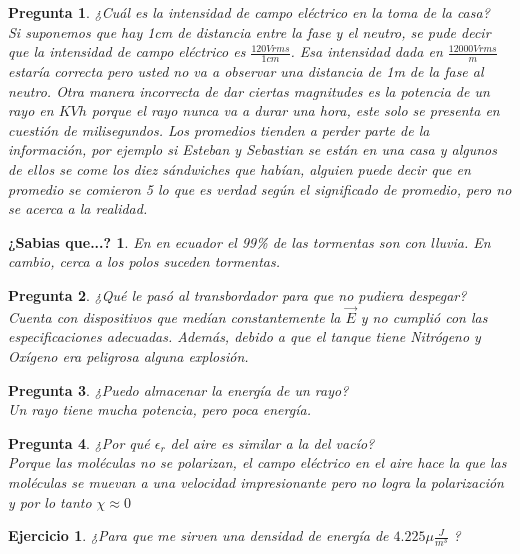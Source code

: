 \documentclass[12pt,letterpaper]{book}
\newtheorem{exercise}{Ejercicio}[section]
\newtheorem{question}{Pregunta}[section]
\newtheorem{sabias}{¿Sabias que...?}[section]
\begin{document}
\begin{question}
¿Cuál es la intensidad de campo eléctrico en la toma de la casa?\\
Si suponemos que hay 1cm de distancia entre la fase y el neutro, se pude decir que la intensidad de campo eléctrico es $\frac{120 Vrms}{1cm}$. Esa intensidad dada en $\frac{12000 Vrms}{m}$ estaría correcta pero usted no va a observar una distancia de 1m de la fase al neutro. Otra manera incorrecta de dar ciertas magnitudes es la potencia de un rayo en $KVh$ porque el rayo nunca va a durar una hora, este solo se presenta en cuestión de milisegundos. Los promedios tienden a perder parte de la información, por ejemplo si Esteban y Sebastian se están en una casa y algunos de ellos se come los diez sándwiches que habían, alguien puede decir que en promedio se comieron 5 lo que es verdad según el significado de promedio, pero no se acerca a la realidad.
\end{question}


\begin{sabias}
En en ecuador el 99\% de las tormentas son con lluvia. En cambio, cerca a los polos suceden tormentas.
\end{sabias}

 \begin{question}
 ¿Qué le pasó al transbordador para que no pudiera despegar?\\
 Cuenta con dispositivos que medían constantemente la $\vec{E}$ y no cumplió con las especificaciones adecuadas. Además, debido a que el tanque tiene Nitrógeno y Oxígeno era peligrosa alguna explosión.
 \end{question}

 \begin{question}
 ¿Puedo almacenar la energía de un rayo?\\
 Un rayo tiene mucha potencia, pero poca energía.
 \end{question}


 \begin{question}
 ¿Por qué $\epsilon _r$ del aire es similar a la del vacío?\\
 Porque las moléculas no se polarizan, el campo eléctrico en el aire hace la que las moléculas se muevan a una velocidad impresionante pero no logra la polarización y por lo tanto $ \chi \approx 0$
 \end{question}


 \begin{exercise}
 ¿Para que me sirven una densidad de energía de $4.225 \mu \frac{J}{m^3}$ ?\\
 \end{exercise}




\end{document}
